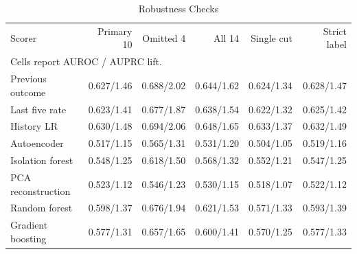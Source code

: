 \begin{table}[htbp]
\centering
\scriptsize\setlength{\tabcolsep}{1.5pt}
\caption{Robustness Checks}
\label{tab:robustness}
\begin{tabular}{lrrrrr}
\toprule
Scorer & Primary 10 & Omitted 4 & All 14 & Single cut & Strict label \\
\multicolumn{6}{l}{\scriptsize Cells report AUROC / AUPRC lift.} \\
\midrule
Previous outcome & 0.627/1.46 & 0.688/2.02 & 0.644/1.62 & 0.624/1.34 & 0.628/1.47 \\
Last five rate & 0.623/1.41 & 0.677/1.87 & 0.638/1.54 & 0.622/1.32 & 0.625/1.42 \\
History LR & 0.630/1.48 & 0.694/2.06 & 0.648/1.65 & 0.633/1.37 & 0.632/1.49 \\
Autoencoder & 0.517/1.15 & 0.565/1.31 & 0.531/1.20 & 0.504/1.05 & 0.519/1.16 \\
Isolation forest & 0.548/1.25 & 0.618/1.50 & 0.568/1.32 & 0.552/1.21 & 0.547/1.25 \\
PCA reconstruction & 0.523/1.12 & 0.546/1.23 & 0.530/1.15 & 0.518/1.07 & 0.522/1.12 \\
Random forest & 0.598/1.37 & 0.676/1.94 & 0.621/1.53 & 0.571/1.33 & 0.593/1.39 \\
Gradient boosting & 0.577/1.31 & 0.657/1.65 & 0.600/1.41 & 0.570/1.25 & 0.577/1.33 \\
\bottomrule
\end{tabular}
\end{table}
